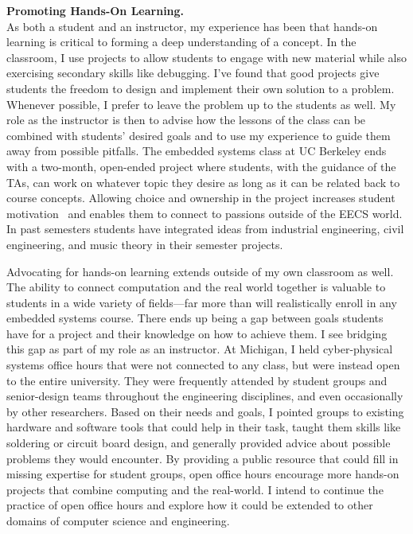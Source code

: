 \documentclass[11pt]{article} %
\begin{document}
\bigskip
\textbf{\textsf{\large Promoting Hands-On Learning.}}\\
As both a student and an instructor, my experience has been that hands-on
learning is critical to forming a deep understanding of a concept. In the
classroom, I use projects to allow students to engage with new material while
also exercising secondary skills like debugging. I've found that good projects
give students the freedom to design and implement their own solution to a
problem. Whenever possible, I prefer to leave the problem up to the students as
well. My role as the instructor is then to advise how the lessons of the class
can be combined with students' desired goals and to use my experience to guide
them away from possible pitfalls. The embedded systems class at UC Berkeley
ends with a two-month, open-ended project where students, with the guidance of
the TAs, can work on whatever topic they desire as long as it can be related
back to course concepts. Allowing choice and ownership in the project increases
student motivation~\footnotemark{} and enables them to connect to passions outside
of the EECS world. In past semesters students have integrated ideas
from industrial engineering, civil engineering, and music theory in their
semester projects.


Advocating for hands-on learning extends outside of my own classroom as well.
The ability to connect computation and the real world together is valuable to
students in a wide variety of fields---far more than will realistically enroll
in any embedded systems course.
%
There ends up being a gap between goals students have for a project and their
knowledge on how to achieve them.
I see bridging this gap as part of my role as an instructor.
%
At Michigan, I held cyber-physical systems office hours that were not connected
to any class, but were instead open to the entire university. They were
frequently attended by student groups and senior-design teams throughout the
engineering disciplines, and even occasionally by other researchers.
%
Based on their needs and goals,
I pointed groups to existing hardware and software tools that could help in
their task, taught them skills like soldering or circuit board design, and
generally provided advice about possible problems they would encounter.
%
By providing a public resource that could fill in missing expertise for student
groups, open office hours encourage more hands-on projects that combine
computing and the real-world. I intend to continue the practice of open office
hours and explore how it could be extended to other domains of computer science
and engineering.
\end{document}
